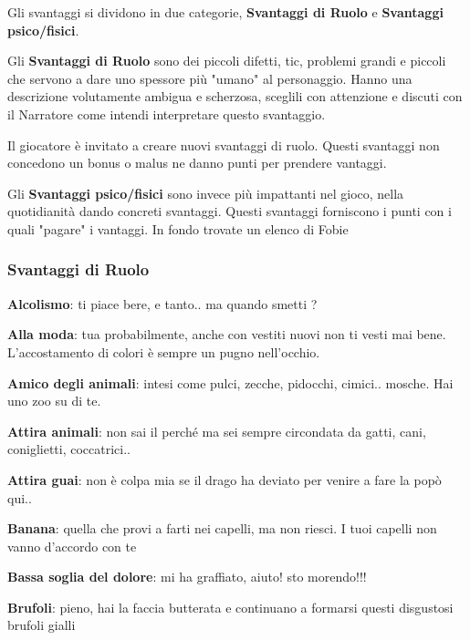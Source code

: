 \documentclass[a4paper,11pt,twoside,openany]{book}
\begin{document}
Gli svantaggi si dividono in due categorie, \textbf{Svantaggi di Ruolo} e \textbf{Svantaggi psico/fisici}.

Gli \textbf{Svantaggi di Ruolo} sono dei piccoli difetti, tic, problemi grandi e piccoli che servono a dare uno spessore più "umano" al personaggio. Hanno una descrizione volutamente ambigua e scherzosa, sceglili con attenzione e discuti con il Narratore come intendi interpretare questo svantaggio.

Il giocatore è invitato a creare nuovi svantaggi di ruolo. Questi svantaggi non concedono un bonus o malus ne danno punti per prendere vantaggi.

\bigskip

Gli \textbf{Svantaggi psico/fisici} sono invece più impattanti nel gioco, nella quotidianità dando concreti svantaggi. Questi svantaggi forniscono i punti con i quali "pagare" i vantaggi. In fondo trovate un elenco di Fobie

\pagebreak

\subsubsection{Svantaggi di Ruolo}

\bigskip

\textbf{Alcolismo}: ti piace bere, e tanto.. ma quando smetti ?

\textbf{Alla moda}: tua probabilmente, anche con vestiti nuovi non ti vesti mai bene. L'accostamento di colori è sempre un pugno nell'occhio.

\textbf{Amico degli animali}: intesi come pulci, zecche, pidocchi, cimici.. mosche. Hai uno zoo su di te.

\textbf{Attira animali}: non sai il perché ma sei sempre circondata da gatti, cani, coniglietti, coccatrici..

\textbf{Attira guai}: non è colpa mia se il drago ha deviato per venire a fare la popò qui..

\textbf{Banana}: quella che provi a farti nei capelli, ma non riesci.
I tuoi capelli non vanno d'accordo con te

\textbf{Bassa soglia del dolore}: mi ha graffiato, aiuto! sto morendo!!!

\textbf{Brufoli}: pieno, hai la faccia butterata e continuano a formarsi questi disgustosi brufoli gialli
\end{document}
